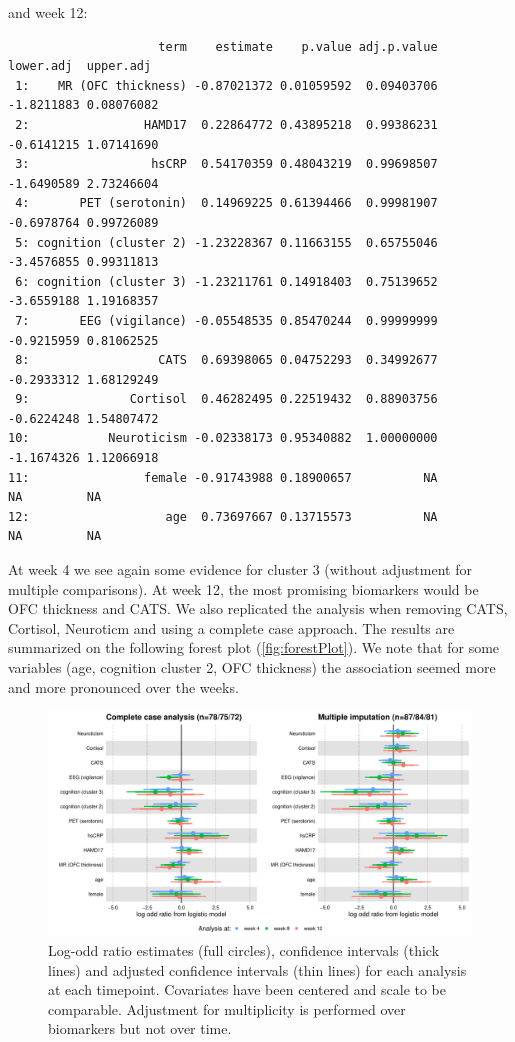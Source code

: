 \documentclass[12pt]{article}
\begin{document}
and week 12:
\begin{verbatim}
                     term    estimate    p.value adj.p.value  lower.adj  upper.adj
 1:    MR (OFC thickness) -0.87021372 0.01059592  0.09403706 -1.8211883 0.08076082
 2:                HAMD17  0.22864772 0.43895218  0.99386231 -0.6141215 1.07141690
 3:                 hsCRP  0.54170359 0.48043219  0.99698507 -1.6490589 2.73246604
 4:       PET (serotonin)  0.14969225 0.61394466  0.99981907 -0.6978764 0.99726089
 5: cognition (cluster 2) -1.23228367 0.11663155  0.65755046 -3.4576855 0.99311813
 6: cognition (cluster 3) -1.23211761 0.14918403  0.75139652 -3.6559188 1.19168357
 7:       EEG (vigilance) -0.05548535 0.85470244  0.99999999 -0.9215959 0.81062525
 8:                  CATS  0.69398065 0.04752293  0.34992677 -0.2933312 1.68129249
 9:              Cortisol  0.46282495 0.22519432  0.88903756 -0.6224248 1.54807472
10:           Neuroticism -0.02338173 0.95340882  1.00000000 -1.1674326 1.12066918
11:                female -0.91743988 0.18900657          NA         NA         NA
12:                   age  0.73697667 0.13715573          NA         NA         NA
\end{verbatim}

At week 4 we see again some evidence for cluster 3 (without adjustment
for multiple comparisons). At week 12, the most promising biomarkers
would be OFC thickness and CATS. We also replicated the analysis when
removing CATS, Cortisol, Neuroticm and using a complete case
approach. The results are summarized on the following forest plot
(\autoref{fig:forestPlot}). We note that for some variables (age,
cognition cluster 2, OFC thickness) the association seemed more and
more pronounced over the weeks.

\clearpage
\begin{figure}[!h]
\centering
\includegraphics[trim={0 0 0 0},width=\textwidth]{./figures/gg-forestplot-OR.pdf}
\caption{\label{fig:forestPlot}Log-odd ratio estimates (full circles), confidence intervals (thick lines) and adjusted confidence intervals (thin lines) for each analysis at each timepoint. Covariates have been centered and scale to be comparable. Adjustment for multiplicity is performed over biomarkers but not over time.}
\end{figure}
\end{document}
